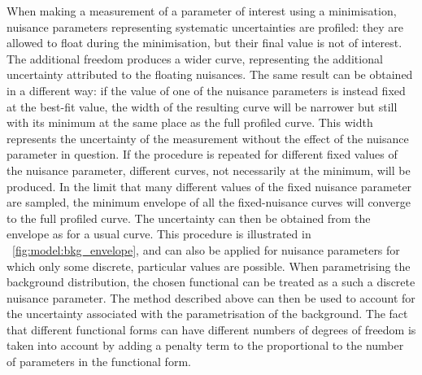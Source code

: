 When making a measurement of a parameter of interest using a \NLL minimisation, nuisance parameters representing systematic uncertainties are profiled: they are allowed to float during the minimisation, but their final value is not of interest. The additional freedom produces a wider \NLL curve, representing the additional uncertainty attributed to the floating nuisances. 
The same result can be obtained in a different way: if the value of one of the nuisance parameters is instead fixed at the best-fit value, the width of the resulting \NLL curve will be narrower but still with its minimum at the same place as the full profiled \NLL curve. This width represents the uncertainty of the measurement without the effect of the nuisance parameter in question. If the procedure is repeated for different fixed values of the nuisance parameter, different \NLL curves, not necessarily at the minimum, will be produced. In the limit that many different values of the fixed nuisance parameter are sampled, the minimum envelope of all the fixed-nuisance \NLL curves will converge to the full profiled \NLL curve. The uncertainty can then be obtained from the envelope as for a usual \NLL curve. This procedure is illustrated in \Fig~\ref{fig:model:bkg_envelope}, and can also be applied for nuisance parameters for which only some discrete, particular values are possible. When parametrising the background distribution, the chosen functional can be treated as a such a discrete nuisance parameter. The method described above can then be used to account for the uncertainty associated with the parametrisation of the background. The fact that different functional forms can have different numbers of degrees of freedom is taken into account by adding a penalty term to the \NLL proportional to the number of parameters in the functional form. 

